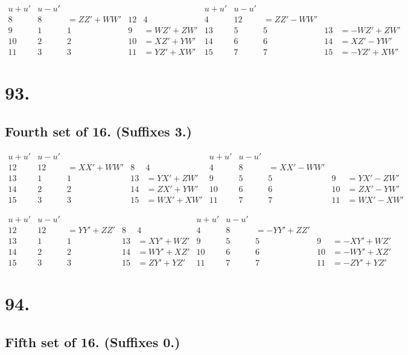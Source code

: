 \documentclass[11pt,a4paper]{article}
\begin{document}
\[
\begin{array}{c|cccc|c|cccc}
u+u' & u-u' & & & & u+u' & u-u' & & & \\
\hline
8 & 8 & = ZZ' + WW' & 12 & 4 & 4 & 12 & = ZZ' - WW' \\
9 & 1 & 1 & 9 & = WZ' + ZW' & 13 & 5 & 5 & 13 & = -WZ' + ZW' \\
10 & 2 & 2 & 10 & = XZ' + YW' & 14 & 6 & 6 & 14 & = XZ' - YW' \\
11 & 3 & 3 & 11 & = YZ' + XW' & 15 & 7 & 7 & 15 & = -YZ' + XW'
\end{array}
\]


\newpage
\section*{93.}
\label{sec:93}

\subsection*{Fourth set of 16. (Suffixes 3.)}

\[
\begin{array}{c|cccc|c|cccc}
u+u' & u-u' & & & & u+u' & u-u' & & & \\
\hline
12 & 12 & = XX' + WW' & 8 & 4 & 4 & 8 & = XX' - WW' \\
13 & 1 & 1 & 13 & = YX' + ZW' & 9 & 5 & 5 & 9 & = YX' - ZW' \\
14 & 2 & 2 & 14 & = ZX' + YW' & 10 & 6 & 6 & 10 & = ZX' - YW' \\
15 & 3 & 3 & 15 & = WX' + XW' & 11 & 7 & 7 & 11 & = WX' - XW'
\end{array}
\]

\[
\begin{array}{c|cccc|c|cccc}
u+u' & u-u' & & & & u+u' & u-u' & & & \\
\hline
12 & 12 & = YY' + ZZ' & 8 & 4 & 4 & 8 & = -YY' + ZZ' \\
13 & 1 & 1 & 13 & = XY' + WZ' & 9 & 5 & 5 & 9 & = -XY' + WZ' \\
14 & 2 & 2 & 14 & = WY' + XZ' & 10 & 6 & 6 & 10 & = -WY' + XZ' \\
15 & 3 & 3 & 15 & = ZY' + YZ' & 11 & 7 & 7 & 11 & = -ZY' + YZ'
\end{array}
\]

\newpage
\section*{94.}
\label{sec:94}

\subsection*{Fifth set of 16. (Suffixes 0.)}
\end{document}
